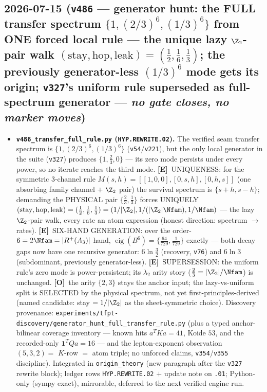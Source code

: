 \documentclass[11pt]{article}
\providecommand{\mE}{\textbf{[E]}}\providecommand{\mC}{\textbf{[C]}}
\providecommand{\mO}{\textbf{[O]}}\providecommand{\mX}{\textbf{[X]}}
\begin{document}
\subsection*{2026-07-15 (\texttt{v486} --- generator hunt: the FULL transfer spectrum $\{1,(2/3)^6,(1/3)^6\}$ from ONE forced local rule --- the unique lazy $\Z_2$-pair walk $(\mathrm{stay},\mathrm{hop},\mathrm{leak})=(\tfrac12,\tfrac16,\tfrac13)$; the previously generator-less $(1/3)^6$ mode gets its origin; \texttt{v327}'s uniform rule superseded as full-spectrum generator --- \emph{no gate closes, no marker moves})}
\begin{itemize}[leftmargin=1.5em]
\item \textbf{\texttt{v486\_transfer\_full\_rule.py} (\texttt{HYP.REWRITE.02}).} The verified seam
transfer spectrum is $\{1,(2/3)^6,(1/3)^6\}$ (\texttt{v54}/\texttt{v221}), but the only local generator
in the suite (\texttt{v327}) produces $\{1,\tfrac23,0\}$ --- its zero mode persists under every power, so
no iterate reaches the third mode. \mE\ UNIQUENESS: for the symmetric $3$-channel rule
$M(s,h)=[[1,0,0],[0,s,h],[0,h,s]]$ (one absorbing family channel $+$ $\Z_2$ pair) the survival spectrum
is $\{s{+}h,s{-}h\}$; demanding the PHYSICAL pair $\{\tfrac23,\tfrac13\}$ forces UNIQUELY
$(\mathrm{stay},\mathrm{hop},\mathrm{leak})=(\tfrac12,\tfrac16,\tfrac13)=(1/|\Z_2|,1/(|\Z_2|\Nfam),
1/\Nfam)$ --- the lazy $\Z_2$-pair walk, every rate an atom expression (honest direction: spectrum $\to$
rates). \mE\ SIX-HAND GENERATION: over the order-$6=2\Nfam=|R^+(A_3)|$ hand,
$\operatorname{eig}(B^6)=\{\tfrac{64}{729},\tfrac1{729}\}$ exactly --- both decay gaps now have one
recursive generator: $6\ln\tfrac32$ (recovery, \texttt{v76}) and $6\ln3$ (subdominant, previously
generator-less). \mE\ SUPERSESSION: the uniform rule's zero mode is power-persistent; its $\lambda_2$
arity story ($\tfrac23=|\Z_2|/\Nfam$) is unchanged. \mO\ the arity $\{2,3\}$ stays the anchor input; the
lazy-vs-uniform split is SELECTED by the physical spectrum, not yet first-principles-derived (named
candidate: stay $=1/|\Z_2|$ as the sheet-symmetric choice). Discovery provenance:
\texttt{experiments/tfpt-discovery/generator\_hunt\_full\_transfer\_rule.py} (plus a typed
anchor-bilinear coverage inventory --- known hits $a^TKa{=}41$, Koide $53$, and the recorded-only
$\mathbf1^TQa{=}16$ --- and the lepton-exponent observation $(5,3,2)=$ $K$-row $=$ atom triple; no
unforced claims, \texttt{v354}/\texttt{v355} discipline). Integrated in \texttt{origin\_theory} (new
paragraph after the \texttt{v327} rewrite block); ledger rows \texttt{HYP.REWRITE.02} $+$ update note on
\texttt{.01}; Python-only (sympy exact), mirrorable, deferred to the next verified engine run.
\end{itemize}
\end{document}
